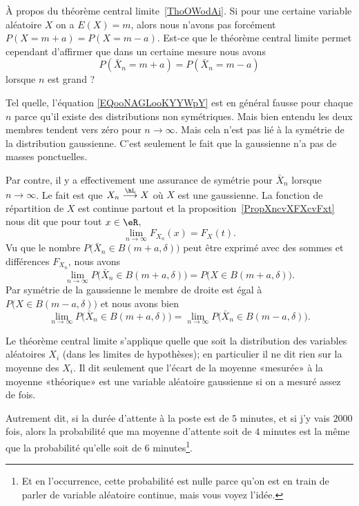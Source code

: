 \begin{normaltext}
	À propos du théorème central limite~\ref{ThoOWodAi}. Si pour une certaine variable aléatoire \( X\) on a \( E(X)=m\), alors nous n'avons pas forcément \( P(X=m+a)=P(X=m-a)\). Est-ce que le théorème central limite permet cependant d'affirmer que dans un certaine mesure nous avons
	\begin{equation}        \label{EQooNAGLooKYYWpY}
		P(\bar X_n=m+a)=P(\bar X_n=m-a)
	\end{equation}
	lorsque \( n\) est grand ?

	Tel quelle, l'équation \eqref{EQooNAGLooKYYWpY} est en général fausse pour chaque \( n\) parce qu'il existe des distributions non symétriques. Mais bien entendu les deux membres tendent vers zéro pour \( n\to \infty\). Mais cela n'est pas lié à la symétrie de la distribution gaussienne. C'est seulement le fait que la gaussienne n'a pas de masses ponctuelles.

	Par contre, il y a effectivement une assurance de symétrie pour \( \bar X_n\) lorsque \( n\to \infty\). Le fait est que \( X_n\stackrel{\hL}{\longrightarrow}X\) où \( X\) est une gaussienne. La fonction de répartition de \( X\) est continue partout et la proposition~\ref{PropXncvXFXcvFxt} nous dit que pour tout \( x\in \eR\),
	\begin{equation}
		\lim_{n\to \infty} F_{X_n}(x)=F_X(t).
	\end{equation}
	Vu que le nombre \( P\big( \bar X_n\in B(m+a,\delta) \big)\) peut être exprimé avec des sommes et différences \( F_{X_n}\), nous avons
	\begin{equation}
		\lim_{n\to \infty} P\big( \bar X_n\in B(m+a,\delta) \big)=P\big( X\in B(m+a,\delta) \big).
	\end{equation}
	Par symétrie de la gaussienne le membre de droite est égal à \( P\big( X\in B(m-a,\delta) \big)\) et nous avons bien
	\begin{equation}
		\lim_{n\to \infty} P\big( \bar X_n\in B(m+a,\delta) \big)= \lim_{n\to \infty} P\big( \bar X_n\in B(m-a,\delta) \big).
	\end{equation}
\end{normaltext}

\begin{remark}  \label{RemRHFDooGbaPYu}

	Le théorème central limite s'applique quelle que soit la distribution des variables aléatoires \( X_i\) (dans les limites de hypothèses); en particulier il ne dit rien sur la moyenne des \( X_i\). Il dit seulement que l'écart de la moyenne «mesurée»  à la moyenne «théorique» est une variable aléatoire gaussienne si on a mesuré assez de fois.

	Autrement dit, si la durée d'attente à la poste est de \( 5\) minutes, et si j'y vais \( 2000\) fois, alors la probabilité que ma moyenne d'attente soit de \( 4\) minutes est la même que la probabilité qu'elle soit de \( 6\) minutes\footnote{Et en l'occurrence, cette probabilité est nulle parce qu'on est en train de parler de variable aléatoire continue, mais vous voyez l'idée.}.

\end{remark}

